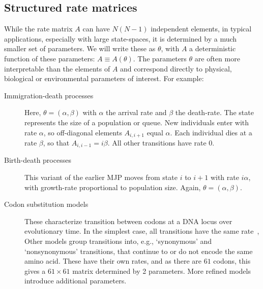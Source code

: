 \subsection{Structured rate matrices}
While the rate matrix $A$ can have $N(N-1)$ independent elements,
in typical applications, especially with large state-spaces, 
it is determined by a much smaller
set of parameters. We will write these as $\theta$, with
$A$ a deterministic function of these parameters: 
$A \equiv A(\theta)$. The parameters $\theta$ are often more 
interpretable than the elements of $A$ and correspond directly to
physical, biological or environmental parameters of interest. 
For example:
\begin{description}
  \item[Immigration-death processes] Here, $\theta = (\alpha,\beta)$
    with $\alpha$ the arrival rate and $\beta$ the death-rate.
    The state represents the size of a 
    population or queue. New individuals
    enter with rate $\alpha$,
    so off-diagonal elements $A_{i,i+1}$ equal $\alpha$.
    Each individual dies %
    at a rate $\beta$, so that %
    $A_{i,i-1}=i\beta$.
    All other transitions have rate $0$. 
  \item[Birth-death processes] This variant of the
    earlier MJP moves from state $i$ 
    to $i+1$ with rate $i\alpha$, with growth-rate proportional to 
    population size. Again, 
    $\theta=(\alpha,\beta)$.
  \item[Codon substitution models] These %
    characterize transition between codons at a 
    DNA locus %
    over evolutionary time. In the simplest case,
    all transitions have the same rate~\cite{jukescantor69}, 
    Other models group transitions 
    into, e.g., `synonymous' and `nonsynonymous' transitions, 
    that continue to or do not encode the same amino acid. 
    These have their own rates, and as 
    there are $61$ codons, this gives a 
    $61\times 61$ matrix determined by 2 parameters. More refined 
    models~\cite{goldman1994codon} introduce additional parameters. 
\end{description}
